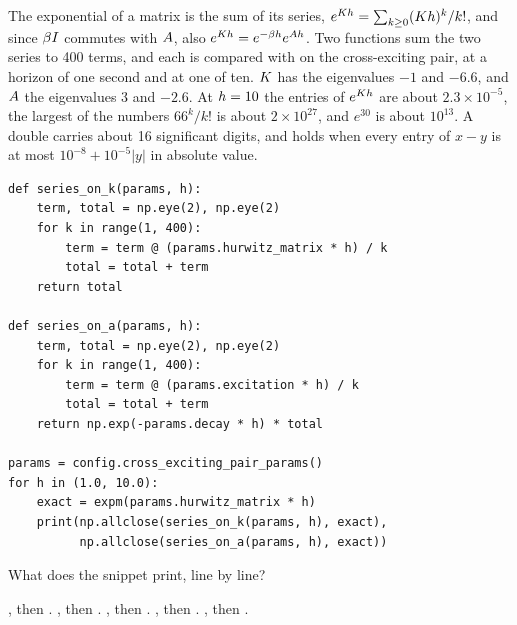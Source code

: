 \begin{question}
\label{question.seriesOnKAgainstSeriesOnTheExcitation}
The exponential of a matrix is the sum of its series,
$e^{K h} = \sum_{k \geq 0} (K h)^{k}/k!$,
and since $\beta I$ commutes with $A$,
also $e^{K h} = e^{-\beta h} e^{A h}$.
Two functions sum the two series to 400 terms,
and each is compared with  on the cross-exciting pair,
at a horizon of one second and at one of ten.
$K$ has the eigenvalues $-1$ and $-6.6$,
and $A$ the eigenvalues $3$ and $-2.6$.
At $h = 10$ the entries of $e^{K h}$ are about $2.3 \times 10^{-5}$,
the largest of the numbers $66^{k}/k!$ is about $2 \times 10^{27}$,
and $e^{30}$ is about $10^{13}$.
A double carries about 16 significant digits,
and  holds when every entry of $x - y$ is at most
$10^{-8} + 10^{-5}\lvert y \rvert$ in absolute value.
\begin{lstlisting}[caption={Two series for the mean response}, label=listing.seriesOnKAgainstSeriesOnTheExcitation]
def series_on_k(params, h):
    term, total = np.eye(2), np.eye(2)
    for k in range(1, 400):
        term = term @ (params.hurwitz_matrix * h) / k
        total = total + term
    return total

def series_on_a(params, h):
    term, total = np.eye(2), np.eye(2)
    for k in range(1, 400):
        term = term @ (params.excitation * h) / k
        total = total + term
    return np.exp(-params.decay * h) * total

params = config.cross_exciting_pair_params()
for h in (1.0, 10.0):
    exact = expm(params.hurwitz_matrix * h)
    print(np.allclose(series_on_k(params, h), exact),
          np.allclose(series_on_a(params, h), exact))
\end{lstlisting}
What does the snippet print, line by line?
\begin{choices}
 \choice {}, then .
 \correctchoice {}, then .
 \choice {}, then .
 \choice {}, then .
 \choice {}, then .
\end{choices}
\end{question}

